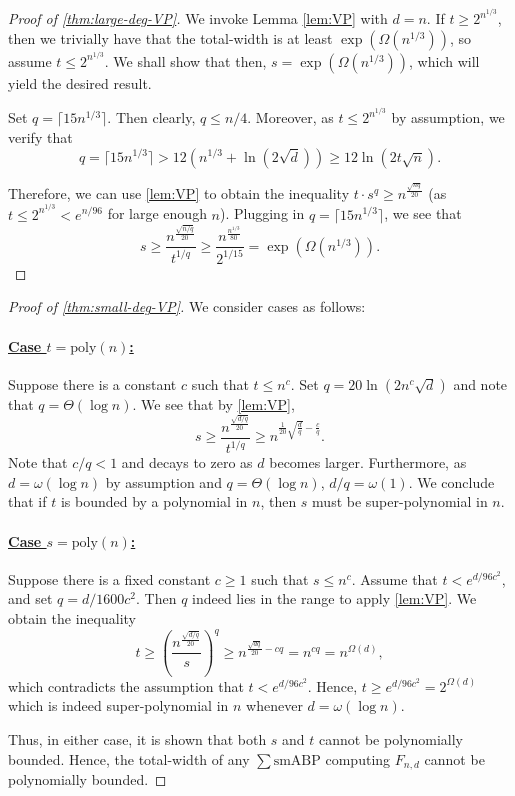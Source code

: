 \documentclass[10pt,a4paper]{article}
\theoremstyle{definition}%
\theoremstyle{plain}
\newcommand{\sbp}{\sum\mathrm{smABP}}
\newcommand{\poly}{\mathrm{poly}}
\begin{document}
\begin{proof}[Proof of \autoref{thm:large-deg-VP}]
We invoke Lemma \ref{lem:VP} with $d = n$. If $t \geq 2^{n^{1/3}}$, then we trivially have that the total-width is at least  ${\exp(\Omega(n^{1/3}))}$, so assume $t \leq 2^{n^{1/3}}$. We shall show that then, $s = \exp(\Omega(n^{1/3}))$, which will yield the desired result.

Set $q = \lceil 15n^{1/3}\rceil$. Then clearly, $q\leq n/4$. Moreover, as $t \leq 2^{n^{1/3}}$ by assumption, we verify that 
\[
q = \lceil 15n^{1/3} \rceil> 12 (n^{1/3} + \ln(2\sqrt{d})) \geq 12\ln(2t\sqrt{n}).
\]

Therefore, we can use \autoref{lem:VP} to obtain the inequality $t\cdot s^q \geq n^{\frac{\sqrt{nq}}{20}}$ (as $t\leq 2^{n^{1/3}}< e^{n/96}$ for large enough $n$). Plugging in $q = \lceil 15n^{1/3} \rceil$, we see that 
\[
s \geq \frac{n^{\frac{\sqrt{n/q}}{20}}}{t^{1/q}} \geq \frac{n^{\frac{n^{1/3}}{80}}}{2^{1/15}} = \exp(\Omega(n^{1/3})).
\]
\end{proof}

\begin{proof}[Proof of \autoref{thm:small-deg-VP}]
We consider cases as follows:

\paragraph{\underline{Case $t = \poly(n)$:}} Suppose there is a constant $c$ such that $t\leq n^c$. Set $q = 20 \ln (2n^c\sqrt{d})$ and note that $q = \Theta(\log n)$. We see that by \autoref{lem:VP},
\[
s \geq \frac{n^{\frac{\sqrt{d/q}}{20}}}{t^{1/q}} \geq n^{\frac{1}{20}\sqrt{\frac{d}{q}} - \frac{c}{q}}.
\]
Note that $c/q <1$ and decays to zero as $d$ becomes larger. Furthermore, as $d = \omega(\log n)$ by assumption and $q = \Theta(\log n)$, $d/q = \omega(1)$. We conclude that if $t$ is bounded by a polynomial in $n$, then $s$ must be super-polynomial in $n$.

\paragraph{\underline{Case $s = \poly(n)$:}} Suppose there is a fixed constant $c\geq 1$ such that $s\leq n^c$. Assume that $t<e^{d/96c^2}$, and set $q = d/1600c^2$. Then $q$ indeed lies in the range to apply \autoref{lem:VP}. We obtain the inequality
\[
t\geq \left(\frac{n^{\frac{\sqrt{d/q}}{20}}}{s}\right)^q \geq n^{\frac{\sqrt{dq}}{20} - cq} = n^{cq} = n^{\Omega(d)},
\]
which contradicts the assumption that $t<e^{d/96c^2}$. Hence, $t \geq e^{d/96c^2} = 2^{\Omega(d)}$ which is indeed super-polynomial in $n$ whenever $d = \omega(\log n)$.

Thus, in either case, it is shown that both $s$ and $t$ cannot be polynomially bounded. Hence, the total-width of any $\sbp$ computing $F_{n,d}$ cannot be polynomially bounded.
\end{proof}
\end{document}
